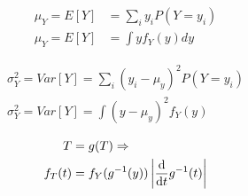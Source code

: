 \thispagestyle{empty}


\begin{minipage}[c]{0.3\textwidth}
\begin{align*}
  \mu_Y = E[Y] &= \sum_i y_i P(Y=y_i)\\
  \mu_Y = E[Y] &= \int y f_Y(y) dy
\end{align*}
\end{minipage}%
\begin{minipage}[c]{0.3\textwidth}
\begin{align*}
  \sigma^2_Y = Var[Y] = \sum_i (y_i-\mu_y)^2 P(Y=y_i) \\
  \sigma^2_Y = Var[Y] = \int (y-\mu_y)^2  f_Y(y)
\end{align*}
\end{minipage}%
\begin{minipage}[c]{0.3\textwidth}
\begin{align*}
  T &= g(T) \Rightarrow \\
  f_T(t) &= f_Y(g^{-1}(y)) \left| \frac{{\rm d}}{{\rm d}t}g^{-1}(t)\right| 
\end{align*}
\end{minipage}


\vspace{0.3cm}

